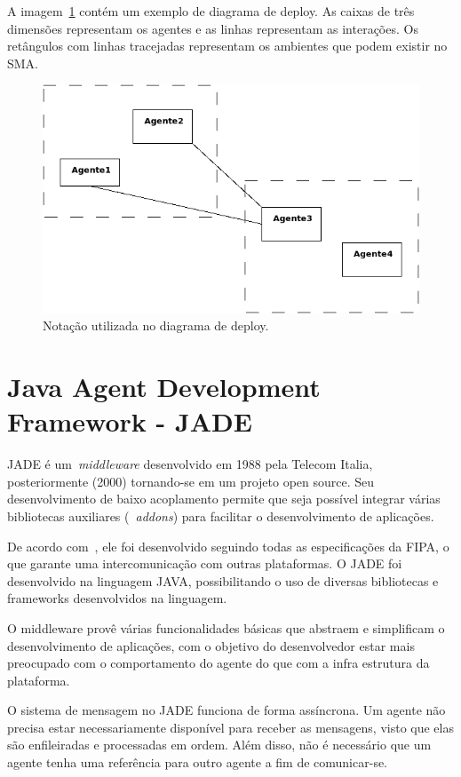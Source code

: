 A imagem~\ref{fig:exemplo-diagrama-deploy} contém um exemplo de diagrama de deploy. As caixas de três dimensões representam os agentes e as linhas representam as interações. Os retângulos com linhas tracejadas representam os ambientes que podem existir no SMA.

\begin{figure}
	\centering
	\includegraphics[scale=0.65]{images/exemplo-diagrama-deploy.png}
	\caption{Notação utilizada no diagrama de deploy.}
	\label{fig:exemplo-diagrama-deploy}
\end{figure}

\section{Java Agent Development Framework - JADE}

JADE é um~\emph{middleware} desenvolvido em 1988 pela Telecom Italia, posteriormente (2000) tornando-se em um projeto open source. Seu desenvolvimento de baixo acoplamento permite que seja possível integrar várias bibliotecas auxiliares (~\emph{addons}) para facilitar o desenvolvimento de aplicações.

De acordo com~\cite{bellifemine07}, ele foi desenvolvido seguindo todas as especificações da FIPA, o que garante uma intercomunicação com outras plataformas. O JADE foi desenvolvido na linguagem JAVA, possibilitando o uso de diversas bibliotecas e frameworks desenvolvidos na linguagem.

O middleware provê várias funcionalidades básicas que abstraem e simplificam o desenvolvimento de aplicações, com o objetivo do desenvolvedor estar mais preocupado com o comportamento do agente do que com a infra estrutura da plataforma.

O sistema de mensagem no JADE funciona de forma assíncrona. Um agente não precisa estar necessariamente disponível para receber as mensagens, visto que elas são enfileiradas e processadas em ordem. Além disso, não é necessário que um agente tenha uma referência para outro agente a fim de comunicar-se.

